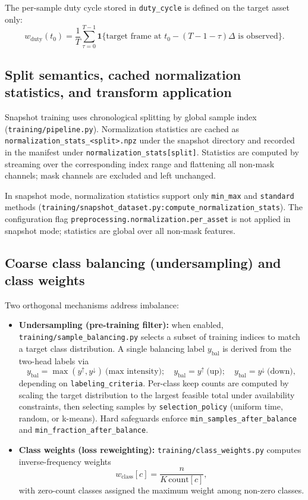 \documentclass[11pt]{article}
\begin{document}
The per-sample duty cycle stored in \texttt{duty\_cycle} is defined on the target asset only:
\begin{equation}
  w_{\mathrm{duty}}(t_0) = \frac{1}{T}\sum_{\tau=0}^{T-1} \mathbf{1}\{\text{target frame at }t_0-(T-1-\tau)\Delta\text{ is observed}\}.
\end{equation}

\subsection{Split semantics, cached normalization statistics, and transform application}

Snapshot training uses chronological splitting by global sample index (\texttt{training/pipeline.py}). Normalization statistics are cached as \texttt{normalization\_stats\_<split>.npz} under the snapshot directory and recorded in the manifest under \texttt{normalization\_stats[split]}. Statistics are computed by streaming over the corresponding index range and flattening all non-mask channels; mask channels are excluded and left unchanged.

In snapshot mode, normalization statistics support only \texttt{min\_max} and \texttt{standard} methods (\texttt{training/snapshot\_dataset.py:compute\_normalization\_stats}). The configuration flag \texttt{preprocessing.normalization.per\_asset} is not applied in snapshot mode; statistics are global over all non-mask features.

\subsection{Coarse class balancing (undersampling) and class weights}

Two orthogonal mechanisms address imbalance:
\begin{itemize}
  \item \textbf{Undersampling (pre-training filter):} when enabled, \texttt{training/sample\_balancing.py} selects a subset of training indices to match a target class distribution. A single balancing label $y_{\mathrm{bal}}$ is derived from the two-head labels via
  \begin{equation}
    y_{\mathrm{bal}} = \max(y^{\uparrow}, y^{\downarrow})\ \text{(max intensity)};\quad y_{\mathrm{bal}} = y^{\uparrow}\ \text{(up)};\quad y_{\mathrm{bal}} = y^{\downarrow}\ \text{(down)},
  \end{equation}
  depending on \texttt{labeling\_criteria}. Per-class keep counts are computed by scaling the target distribution to the largest feasible total under availability constraints, then selecting samples by \texttt{selection\_policy} (uniform time, random, or k-means). Hard safeguards enforce \texttt{min\_samples\_after\_balance} and \texttt{min\_fraction\_after\_balance}.
  \item \textbf{Class weights (loss reweighting):} \texttt{training/class\_weights.py} computes inverse-frequency weights
  \begin{equation}
    w_{\mathrm{class}}[c] = \frac{n}{K\,\mathrm{count}[c]},
  \end{equation}
  with zero-count classes assigned the maximum weight among non-zero classes.
\end{itemize}
\end{document}
